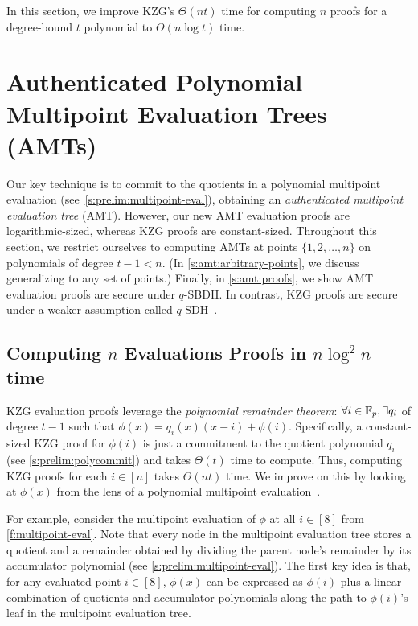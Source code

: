 In this section, we improve KZG's $\Theta(nt)$ time for computing $n$ proofs for a degree-bound $t$ polynomial to $\Theta(n\log{t})$ time.

\section{Authenticated Polynomial Multipoint Evaluation Trees (AMTs)}
Our key technique is to commit to the quotients in a polynomial multipoint evaluation (see~\cref{s:prelim:multipoint-eval}), obtaining an \textit{authenticated multipoint evaluation tree} (AMT).
However, our new AMT evaluation proofs are logarithmic-sized, whereas KZG proofs are constant-sized.
Throughout this section, we restrict ourselves to computing AMTs at points $\{1,2,\dots,n\}$ on polynomials of degree $t-1 < n$.
(In \cref{s:amt:arbitrary-points}, we discuss generalizing to any set of points.)
Finally, in \cref{s:amt:proofs}, we show AMT evaluation proofs are secure under $q$-SBDH.
In contrast, KZG proofs are secure under a weaker assumption called $q$-SDH~\cite{BB08}.

\subsection{Computing $n$ Evaluations Proofs in $n\log^2{n}$ time}
\label{s:amt:computing-proofs}
KZG evaluation proofs leverage the \textit{polynomial remainder theorem}: $\forall i\in \mathbb{F}_p, \exists q_i$ of degree $t-1$ such that $\phi(x) = q_i(x)(x-i) + \phi(i)$.
Specifically, a constant-sized KZG proof for $\phi(i)$ is just a commitment to the quotient polynomial $q_i$ (see \cref{s:prelim:polycommit}) and takes $\Theta(t)$ time to compute.
Thus, computing KZG proofs for each $i\in[n]$ takes $\Theta(nt)$ time.
We improve on this by looking at $\phi(x)$ from the lens of a polynomial multipoint evaluation~\cite{vG13ModernCh10}.

For example, consider the multipoint evaluation of $\phi$ at all $i\in[8]$ from \cref{f:multipoint-eval}.
Note that every node in the multipoint evaluation tree stores a quotient and a remainder obtained by dividing the parent node's remainder by its accumulator polynomial (see \cref{s:prelim:multipoint-eval}).
The first key idea is that, for any evaluated point $i\in[8]$, $\phi(x)$ can be expressed as $\phi(i)$ plus a linear combination of quotients and accumulator polynomials along the path to $\phi(i)$'s leaf in the multipoint evaluation tree.

